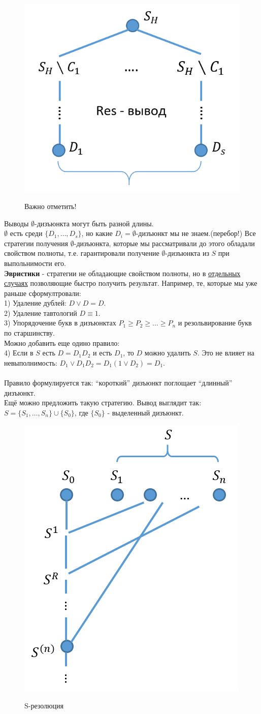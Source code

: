 \documentclass{article}
\numberwithin{example}{section}
\numberwithin{question}{section}
\numberwithin{Remark}{section}
\numberwithin{theorem}{section}
\numberwithin{definition}{section}
\numberwithin{proposition}{section}
\begin{document}
\begin{figure}[!htbp]
	\centering
	\includegraphics[width=0.3\linewidth]{7-3}
	\label{fig:7-3}
	\caption{Важно отметить!}
\end{figure}
Выводы $\emptyset$-дизъюнкта могут быть разной длины. \\
$\emptyset$ есть среди $\{D_1,\ldots,D_s \}$, но какие $D_i=\emptyset$-дизъюнкт мы не знаем.(перебор!) Все стратегии получения $\emptyset$-дизъюнкта, которые мы рассматривали до этого обладали свойством полноты, т.е. гарантировали получение $\emptyset$-дизъюнкта из $S$ при выпольнимости его.\\
\textbf{Эвристики} - стратегии не обладающие свойством полноты, но в \underline{отдельных случаях} позволяющие быстро получить результат. Например, те, которые мы уже раньше сформултровали:\\
1) Удаление дублей: $D\vee D=D$.\\
2) Удаление тавтологий $D\equiv 1$.\\
3) Упорядочение букв в дизъюнктах $P_1\geqslant P_2\geqslant \ldots\geqslant P_n$ и резольвирование букв по старшинству.\\
Можно добавить еще одино правило:\\
4) Если в $S$ есть $D=D_1D_2$ и есть $D_1$, то $D$ можно удалить $S$. Это не влияет на невыполнимость: $D_1\vee D_1D_2=D_1(1\vee D_2)=D_1$.\\
\\
Правило формулируется так: ``короткий'' дизъюнкт поглощает ``длинный'' дизъюнкт.\\
Ещё можно предложить такую стратегию. Вывод выглядит так: $S=\{S_1,\ldots,S_n \}\cup\{S_0\}$, где $\{S_0\}$ - выделенный дизъюнкт.
\begin{figure}[!htbp]
	\centering
	\includegraphics[width=0.3\linewidth]{7-4}
	\label{fig:7-4}
	\caption{S-резолюция}
\end{figure}
\end{document}

